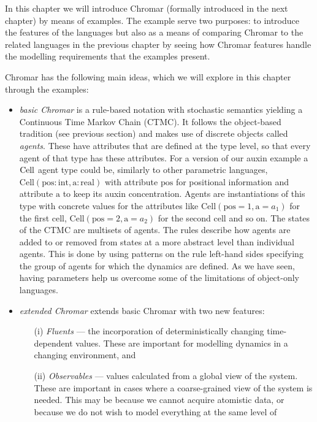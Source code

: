 In this chapter we will introduce Chromar (formally introduced in the next
chapter) by means of examples. The example serve two purposes: to introduce the
features of the languages but also as a means of comparing Chromar to the related
languages in the previous chapter by seeing how Chromar features handle the
modelling requirements that the examples present.

Chromar has the following main ideas, which we will explore in this chapter
through the examples:
\begin{itemize}
\item \emph{basic Chromar} is a rule-based notation with stochastic semantics
  yielding a Continuous Time Markov Chain (CTMC). It follows the object-based
  tradition (see previous section) and makes use of discrete objects called
  \emph{agents}. These have attributes that are defined at the type level, so
  that every agent of that type has these attributes. For a version of our auxin
  example a $\mathrm{Cell}$ agent type could be, similarly to other parametric
  languages,
  $\mathrm{Cell}(\mathrm{pos}:\mathrm{int}, \mathrm{a}: \mathrm{real})$ with
  attribute $\mathrm{pos}$ for positional information and attribute $\mathrm{a}$
  to keep its auxin concentration. Agents are instantiations of this type with
  concrete values for the attributes like
  $\mathrm{Cell}(\mathrm{pos}=1, \mathrm{a}=a_1)$ for the first cell,
  $\mathrm{Cell}(\mathrm{pos}=2, \mathrm{a}=a_2)$ for the second cell and so
  on. The states of the CTMC are multisets of agents. The rules describe how
  agents are added to or removed from states at a more abstract level than
  individual agents. This is done by using patterns on the rule left-hand sides
  specifying the group of agents for which the dynamics are defined. As we have
  seen, having parameters help us overcome some of the limitations of object-only
  languages.
\item \emph{extended Chromar} extends basic Chromar with two new features:
  \begin{itemize}
  \item[(i)] \textit{Fluents} --- the incorporation of deterministically
    changing time-dependent values. These are important for modelling dynamics
    in a changing environment, and
  \item[(ii)] \textit{Observables} --- values calculated from a global view of
    the system. These are important in cases where a coarse-grained view of the
    system is needed. This may be because we cannot acquire atomistic data, or
    because we do not wish to model everything at the same level of

\end{itemize}
\end{itemize}
